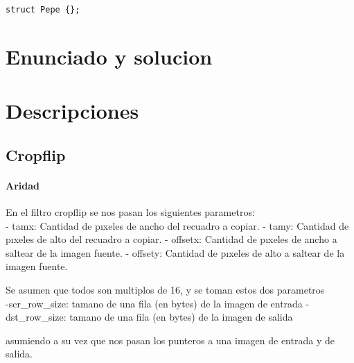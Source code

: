 \documentclass[a4paper]{article}
\newenvironment{codesnippet}{%
	\begin{Sbox}\begin{minipage}{\textwidth}\sffamily\small}%
	{\end{minipage}\end{Sbox}%
		\begin{center}%
		\vspace{-0.4cm}\colorbox{litegrey}{\TheSbox}\end{center}\vspace{0.3cm}}
\begin{document}
\begin{codesnippet}
\begin{verbatim}
struct Pepe {};
\end{verbatim}
\end{codesnippet}


\section{Enunciado y solucion} 
%


\section{Descripciones}

\subsection{Cropflip}

\paragraph{\textbf{Aridad}}

En el filtro cropflip se nos pasan los siguientes parametros:
\hfill \break
\\
- tamx: Cantidad de pıxeles de ancho del recuadro a copiar.
\hfill \break
- tamy: Cantidad de pıxeles de alto del recuadro a copiar.
\hfill \break
- offsetx: Cantidad de pıxeles de ancho a saltear de la imagen fuente.
\hfill \break
- offsety: Cantidad de pıxeles de alto a saltear de la imagen fuente.
\hfill \break

Se asumen que todos son multiplos de 16, y se toman estos dos parametros
\hfill \break
\\
-scr_row_size: tamano de una fila (en bytes) de la imagen de entrada
\hfill \break
-dst_row_size: tamano de una fila (en bytes) de la imagen de salida
\hfill \break

asumiendo a su vez que nos pasan los punteros a una imagen de entrada y de salida.
\hfill \break
\end{document}

